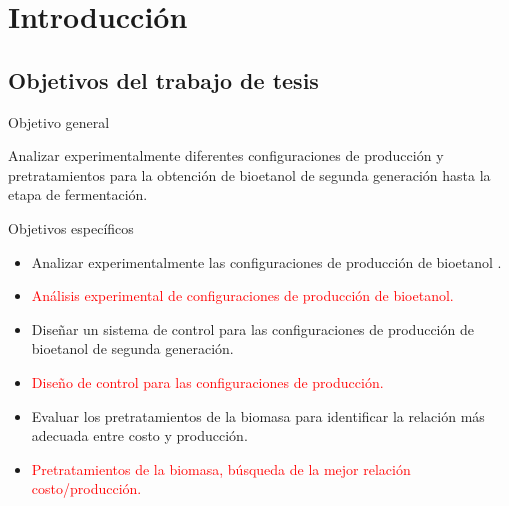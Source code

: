 \documentclass[12pt]{article}
\begin{document}
	
	
	\tableofcontents
	\date{}
     \newpage
	\listoftables
	\newpage
	
	
	
	\setcounter{page}{1} 
		\section{Introducción}
	
		
		
		
	\subsection{Objetivos del trabajo de tesis}
	{\large Objetivo general}
	
	Analizar experimentalmente diferentes configuraciones de producción y pretratamientos para la obtención de bioetanol de segunda generación  hasta la etapa de fermentación. \newline \newline
	
	{\large Objetivos específicos}
	
	\begin{itemize}
		\item 
		Analizar experimentalmente las configuraciones de producción de bioetanol .
		\item \textcolor{red}{Análisis experimental de configuraciones de producción de bioetanol.}
		\item 
		Diseñar un sistema de control para las configuraciones de producción de bioetanol de segunda generación.
			
		\item \textcolor{red}{Diseño de control para las configuraciones de producción.}
		
		\item 
       Evaluar los pretratamientos de la biomasa para identificar la relación más adecuada entre costo y producción.
      \item \textcolor{red}{Pretratamientos de la biomasa, búsqueda de la mejor relación costo/producción.}
	\end{itemize}
	
\end{document}
